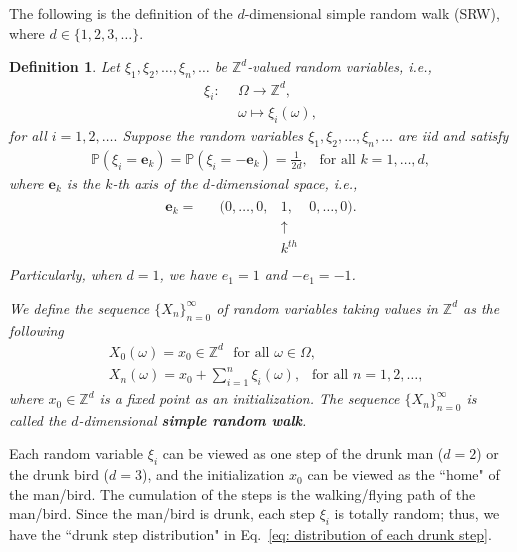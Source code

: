\documentclass[11pt,letterpaper, leqno]{article}
\newtheorem{definition}{Definition}
\numberwithin{equation}{section}
\numberwithin{theorem}{section}
\numberwithin{lemma}{section}
\numberwithin{corollary}{section}
\numberwithin{definition}{section}
\numberwithin{proposition}{section}
\numberwithin{remark}{section}
\numberwithin{example}{section}
\begin{document}
The following is the definition of the $d$-dimensional simple random walk (SRW), where $d\in\{1,2,3,\ldots\}$. 
\begin{definition}
Let $\xi_1,\xi_2,\ldots, \xi_n,\ldots$ be $\mathbb{Z}^d$-valued random variables, i.e.,
\begin{align*}
    \xi_i:\ \ &\Omega \rightarrow \mathbb{Z}^d,\\
    &\omega \mapsto \xi_i(\omega),
\end{align*}
for all $i=1,2,\ldots.$ Suppose the random variables $\xi_1,\xi_2,\ldots, \xi_n,\ldots$ are iid and satisfy
\begin{align}\label{eq: distribution of each drunk step}
    \mathbb{P}(\xi_i=\boldsymbol{e}_k)=\mathbb{P}(\xi_i=-\boldsymbol{e}_k)=\frac{1}{2d}, \ \ \mbox{ for all }k=1,\ldots,d,
\end{align}
where $\boldsymbol{e}_k$ is the $k$-th axis of the $d$-dimensional space, i.e.,
\begin{align*}
    \begin{matrix}
\boldsymbol{e}_k = &
        &(0,\ldots,0,&1,&0,\ldots,0).\\
        &&&\uparrow&    \\
        &&&k^{th}&         \\
\end{matrix}
\end{align*}
Particularly, when $d=1$, we have $e_1=1$ and $-e_1=-1$.

We define the sequence $\{X_n\}_{n=0}^\infty$ of random variables taking values in $\mathbb{Z}^d$ as the following
\begin{align*}
    & X_0(\omega)=x_0\in\mathbb{Z}^d\ \ \ \mbox{for all }\omega\in\Omega,\\
    & X_n(\omega)=x_0+\sum_{i=1}^n \xi_i(\omega),\ \ \mbox{ for all }n=1,2,\ldots,
\end{align*}
where $x_0\in\mathbb{Z}^d$ is a fixed point as an initialization. The sequence $\{X_n\}_{n=0}^\infty$ is called the $d$-dimensional \textbf{simple random walk}.
\end{definition}
Each random variable $\xi_i$ can be viewed as one step of the drunk man ($d=2$) or the drunk bird ($d=3$), and the initialization $x_0$ can be viewed as the ``home" of the man/bird. The cumulation of the steps is the walking/flying path of the man/bird. Since the man/bird is drunk, each step $\xi_i$ is totally random; thus, we have the ``drunk step distribution" in Eq.~\eqref{eq: distribution of each drunk step}.
\end{document}
